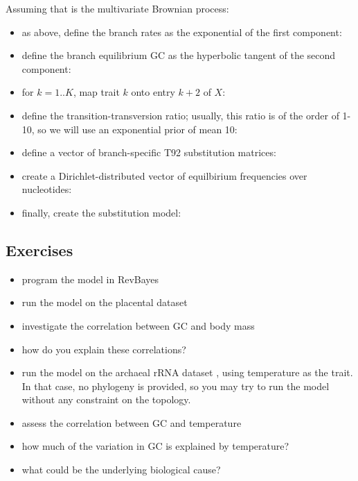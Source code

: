 Assuming that  is the multivariate Brownian process:
\begin{itemize}
\item
as above, define the branch rates as the exponential of the first component:
\\
\item
define the branch equilibrium GC as the hyperbolic tangent of the second component:
\\
\item
for $k=1..K$, map trait $k$ onto entry $k+2$ of $X$:
\\
\item
define the transition-transversion ratio; usually, this ratio is of the order of 1-10, so we will use an exponential prior of mean 10:
\\
\item
define a vector of branch-specific T92 substitution matrices:
\\
\item
create a Dirichlet-distributed vector of equilbirium frequencies over nucleotides:
\\
\item
finally, create the substitution model:
\\
\end{itemize}

\subsection*{Exercises}

\begin{itemize}
\item
program the model in RevBayes
\item
run the model on the placental dataset
\item
investigate the correlation between GC and body mass
\item
how do you explain these correlations?
\item
run the model on the archaeal rRNA dataset , using temperature as the trait. In that case, no phylogeny is provided, so you may try to run the model without any constraint on the topology.
\item
assess the correlation between GC and temperature
\item
how much of the variation in GC is explained by temperature?
\item
what could be the underlying biological cause?
\end{itemize}



